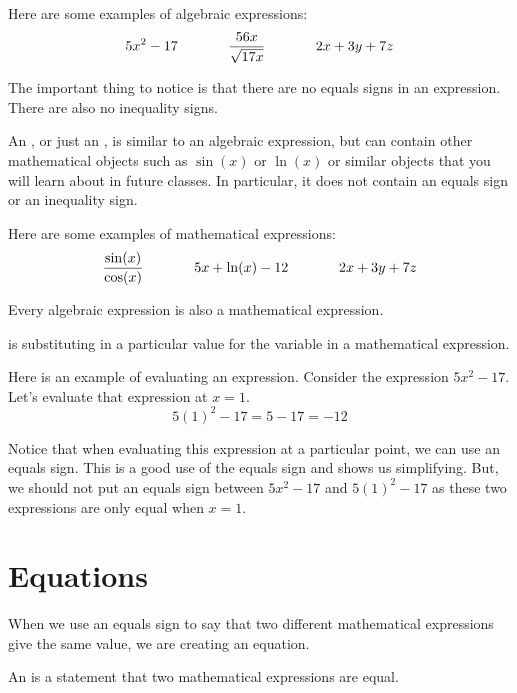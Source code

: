 \documentclass{ximera}
\begin{document}
Here are some examples of algebraic expressions:
$$
5x^2-17  \hspace{.5in}
\frac{56x}{\sqrt{17x}}  \hspace{.5in}
2x+3y+7z
$$

The important thing to notice is that there are no equals signs in an expression.  There are also no inequality signs.

\begin{definition}
An , or just an , is similar to an algebraic expression, but can contain other mathematical objects such as $\sin(x)$ or $\ln(x)$ or similar objects that you will learn about in future classes.  In particular, it does not contain an equals sign or an inequality sign.
\end{definition}

Here are some examples of mathematical expressions:
$$
\frac{\sin(x)}{\cos(x)}  \hspace{.5in}
5x+\ln(x)-12  \hspace{.5in}
2x+3y+7z
$$

Every algebraic expression is also a mathematical expression.

\begin{definition}
 is substituting in a particular value for the variable in a mathematical expression.
\end{definition}

Here is an example of evaluating an expression.  Consider the expression $5x^2-17$.  Let's evaluate that expression at $x=1$.
$$
5(1)^2-17=5-17=-12
$$

Notice that when evaluating this expression at a particular point, we can use an equals sign.  This is a good use of the equals sign and shows us simplifying.  But, we should not put an equals sign between $5x^2-17$ and $5(1)^2-17$ as these two expressions are only equal when $x=1$.

\section{Equations}
When we use an equals sign to say that two different mathematical expressions give the same value, we are creating an equation.

\begin{definition}
An  is a statement that two mathematical expressions are equal.
\end{definition}
\end{document}
